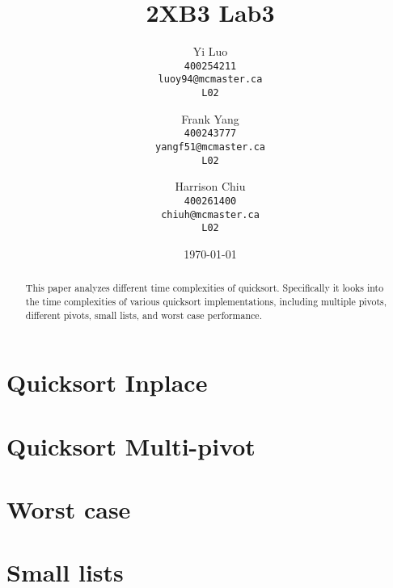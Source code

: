 \documentclass{article}
\title{2XB3 Lab3}
\author{
  Yi Luo\\
  \texttt{400254211}\\
  \texttt{luoy94@mcmaster.ca}\\
  \texttt{L02}
  \and
  Frank Yang\\
  \texttt{400243777}\\
  \texttt{yangf51@mcmaster.ca}\\
  \texttt{L02}
  \and
  Harrison Chiu\\
  \texttt{400261400}\\
  \texttt{chiuh@mcmaster.ca}\\
  \texttt{L02}
}
\date{\today}
\begin{document}
\maketitle

\begin{abstract}
This paper analyzes different time complexities of quicksort. Specifically it looks into the time complexities of various quicksort implementations, including multiple pivots, different pivots, small lists, and worst case performance.
\end{abstract}

\section*{Quicksort Inplace}


\section*{Quicksort Multi-pivot}

\section*{Worst case}

\section*{Small lists}
\end{document}
